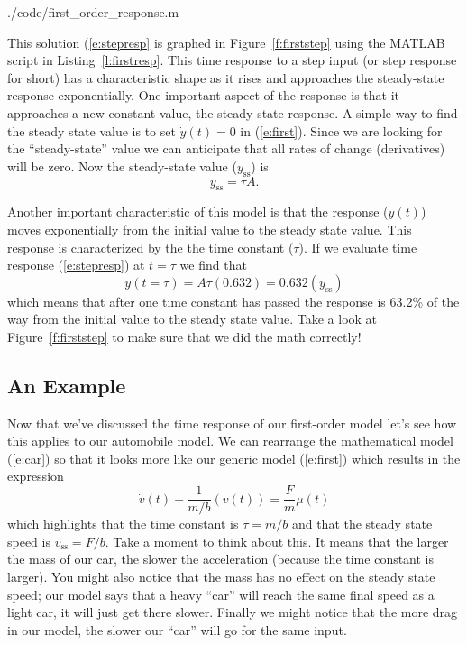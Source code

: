 
{./code/first_order_response.m}


This solution (\ref{e:stepresp} is graphed in Figure~\ref{f:firststep} using the MATLAB script in Listing~\ref{l:firstresp}. This time response to a step input (or step response for short) has a characteristic shape as it rises and approaches the \gls{steady-state response} exponentially.  One important aspect of the response is that it approaches a new constant value, the steady-state response.  A simple way to find the steady state value is to set $\dot{y}(t)=0$ in (\ref{e:first}).  Since we are looking for the ``steady-state'' value we can anticipate that all rates of change (derivatives) will be zero.  Now the steady-state value ($y_{\mathrm{ss}}$) is 
\begin{equation}\label{e:ss}
y_{\mathrm{ss}} = \tau A.
\end{equation}

Another important characteristic of this model is that the response ($y(t)$) moves exponentially from the initial value to the steady state value.  This response is characterized by the the \gls{time constant} ($\tau$).  If we evaluate time response (\ref{e:stepresp}) at $t=\tau$ we find that
\[
y(t=\tau) = A \tau (0.632) = 0.632 (y_{\mathrm{ss}})
\]
which means that after one time constant has passed the response is 63.2\% of the way from the initial value to the steady state value.  Take a look at Figure~\ref{f:firststep} to make sure that we did the math correctly!

\subsection{An Example}
Now that we've discussed the time response of our first-order model let's see how this applies to our automobile model.  We can rearrange the mathematical model (\ref{e:car}) so that it looks more like our generic model (\ref{e:first}) which results in the expression
\begin{equation}\label{e:car2}
\dot{v}(t) + \frac{1}{m/b}(v(t)) = \frac{F}{m}\mu(t)
\end{equation}
which highlights that the time constant is $\tau=m/b$ and that the steady state speed is $v_{\mathrm{ss}}=F/b$.  Take a moment to think about this.  It means that the larger the mass of our car, the slower the acceleration (because the time constant is larger).  You might also notice that the mass has no effect on the steady state speed; our model says that a heavy ``car'' will reach the same final speed as a light car, it will just get there slower.  Finally we might notice that the more drag in our model, the slower our ``car'' will go for the same input.   

